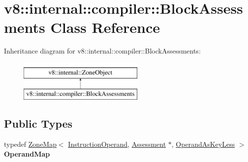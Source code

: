 \hypertarget{classv8_1_1internal_1_1compiler_1_1BlockAssessments}{}\section{v8\+:\+:internal\+:\+:compiler\+:\+:Block\+Assessments Class Reference}
\label{classv8_1_1internal_1_1compiler_1_1BlockAssessments}
Inheritance diagram for v8\+:\+:internal\+:\+:compiler\+:\+:Block\+Assessments\+:\begin{figure}[H]
\begin{center}
\leavevmode
\includegraphics[height=2.000000cm]{classv8_1_1internal_1_1compiler_1_1BlockAssessments}
\end{center}
\end{figure}
\subsection*{Public Types}
\begin{DoxyCompactItemize}
\item 
\mbox{\label{classv8_1_1internal_1_1compiler_1_1BlockAssessments_aadb80ba282499ca7661203edf35956ba}} 
typedef \mbox{\hyperlink{classv8_1_1internal_1_1ZoneMap}{Zone\+Map}}$<$ \mbox{\hyperlink{classv8_1_1internal_1_1compiler_1_1InstructionOperand}{Instruction\+Operand}}, \mbox{\hyperlink{classv8_1_1internal_1_1compiler_1_1Assessment}{Assessment}} $\ast$, \mbox{\hyperlink{structv8_1_1internal_1_1compiler_1_1OperandAsKeyLess}{Operand\+As\+Key\+Less}} $>$ {\bfseries Operand\+Map}
\end{DoxyCompactItemize}
